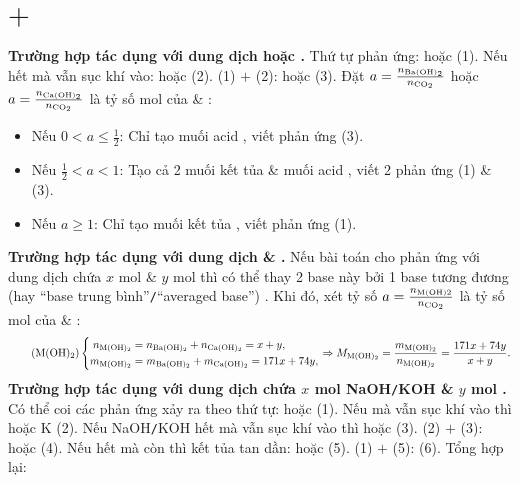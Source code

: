 \documentclass{article}
\begin{document}
\section{ $+$ }
\textbf{\textsf{Trường hợp  tác dụng với dung dịch  hoặc .}} Thứ tự phản ứng:  hoặc  (1). Nếu  hết mà vẫn sục khí  vào:  hoặc  (2). (1) $+$ (2):  hoặc  (3). Đặt $a = \frac{n_{\ce{Ba(OH)2}}}{n_{\ce{CO2}}}$ hoặc $a = \frac{n_{\ce{Ca(OH)2}}}{n_{\ce{CO2}}}$ là tỷ số mol của  \& :
\begin{itemize}
	\item Nếu $0 < a\le\frac{1}{2}$: Chỉ tạo muối acid , viết phản ứng (3).
	\item Nếu $\frac{1}{2} < a < 1$: Tạo cả 2 muối kết tủa  \& muối acid , viết 2 phản ứng (1) \& (3).
	\item Nếu $a\ge1$: Chỉ tạo muối kết tủa , viết phản ứng (1).
\end{itemize}
\textbf{\textsf{Trường hợp  tác dụng với dung dịch  \& .}} Nếu bài toán cho  phản ứng với dung dịch chứa $x$ mol  \& $y$ mol  thì có thể thay 2 base này bởi 1 base tương đương (hay ``base trung bình''{\tt/}``averaged base'') . Khi đó, xét tỷ số $a = \frac{n_{\rm M(OH)2}}{n_{\ce{CO2}}}$ là tỷ số mol của  \& :
\begin{equation}
	\label{M(OH)2}
	\tag{$\rm M(OH)_2$}
	\left\{\begin{split}
		n_{\ce{M(OH)2}} &= n_{\ce{Ba(OH)2}} + n_{\ce{Ca(OH)2}} = x + y,\\
		m_{\ce{M(OH)2}} &= m_{\ce{Ba(OH)2}} + m_{\ce{Ca(OH)2}} = 171x + 74y,
	\end{split}\right.\Rightarrow M_{\ce{M(OH)2}} = \frac{m_{\ce{M(OH)2}}}{n_{\ce{M(OH)2}}} = \frac{171x + 74y}{x + y}.
\end{equation}
\noindent\textbf{\textsf{Trường hợp  tác dụng với dung dịch chứa $x$ mol NaOH{\tt/}KOH \& $y$ mol .}} Có thể coi các phản ứng xảy ra theo thứ tự:  hoặc  (1). Nếu  mà vẫn sục khí  vào thì  hoặc K (2). Nếu NaOH{\tt/}KOH hết mà vẫn sục khí  vào thì  hoặc  (3). (2) $+$ (3):  hoặc  (4). Nếu  hết mà  còn thì kết tủa tan dần:  hoặc  (5). (1) $+$ (5):  (6). Tổng hợp lại:
\end{document}
